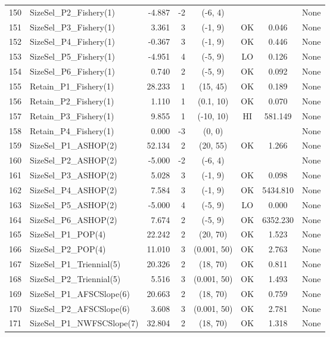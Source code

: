 \documentclass[12pt,]{article}
\begin{document}
\begin{landscape}
\begin{longtable}{rlrrcccl}
  150 & SizeSel\_P2\_Fishery(1) & -4.887 & -2 & (-6, 4) &  &  & None \\ 
  151 & SizeSel\_P3\_Fishery(1) & 3.361 & 3 & (-1, 9) & OK & 0.046 & None \\ 
  152 & SizeSel\_P4\_Fishery(1) & -0.367 & 3 & (-1, 9) & OK & 0.446 & None \\ 
  153 & SizeSel\_P5\_Fishery(1) & -4.951 & 4 & (-5, 9) & LO & 0.126 & None \\ 
  154 & SizeSel\_P6\_Fishery(1) & 0.740 & 2 & (-5, 9) & OK & 0.092 & None \\ 
  155 & Retain\_P1\_Fishery(1) & 28.233 & 1 & (15, 45) & OK & 0.189 & None \\ 
  156 & Retain\_P2\_Fishery(1) & 1.110 & 1 & (0.1, 10) & OK & 0.070 & None \\ 
  157 & Retain\_P3\_Fishery(1) & 9.855 & 1 & (-10, 10) & HI & 581.149 & None \\ 
  158 & Retain\_P4\_Fishery(1) & 0.000 & -3 & (0, 0) &  &  & None \\ 
  159 & SizeSel\_P1\_ASHOP(2) & 52.134 & 2 & (20, 55) & OK & 1.266 & None \\ 
  160 & SizeSel\_P2\_ASHOP(2) & -5.000 & -2 & (-6, 4) &  &  & None \\ 
  161 & SizeSel\_P3\_ASHOP(2) & 5.028 & 3 & (-1, 9) & OK & 0.098 & None \\ 
  162 & SizeSel\_P4\_ASHOP(2) & 7.584 & 3 & (-1, 9) & OK & 5434.810 & None \\ 
  163 & SizeSel\_P5\_ASHOP(2) & -5.000 & 4 & (-5, 9) & LO & 0.000 & None \\ 
  164 & SizeSel\_P6\_ASHOP(2) & 7.674 & 2 & (-5, 9) & OK & 6352.230 & None \\ 
  165 & SizeSel\_P1\_POP(4) & 22.242 & 2 & (20, 70) & OK & 1.523 & None \\ 
  166 & SizeSel\_P2\_POP(4) & 11.010 & 3 & (0.001, 50) & OK & 2.763 & None \\ 
  167 & SizeSel\_P1\_Triennial(5) & 20.326 & 2 & (18, 70) & OK & 0.811 & None \\ 
  168 & SizeSel\_P2\_Triennial(5) & 5.516 & 3 & (0.001, 50) & OK & 1.493 & None \\ 
  169 & SizeSel\_P1\_AFSCSlope(6) & 20.663 & 2 & (18, 70) & OK & 0.759 & None \\ 
  170 & SizeSel\_P2\_AFSCSlope(6) & 3.608 & 3 & (0.001, 50) & OK & 2.781 & None \\ 
  171 & SizeSel\_P1\_NWFSCSlope(7) & 32.804 & 2 & (18, 70) & OK & 1.318 & None \\ 

\end{longtable}
\end{landscape}
\end{document}
